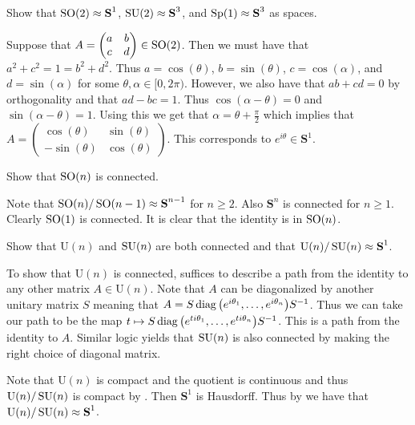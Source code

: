 \documentclass[letterpaper, 11pt, oneside]{book}
\begin{document}
\begin{exercise}
  Show that $\operatorname{SO}(2) \approx \textbf{S}^{1}$, $\operatorname{SU}(2) \approx \textbf{S}^{3}$, and $\operatorname{Sp}(1) \approx \textbf{S}^{3}$ as spaces.
\end{exercise}
\begin{pf}
  Suppose that $A = \begin{pmatrix} a & b \\ c & d \end{pmatrix} \in \operatorname{SO}(2)$.
  Then we must have that $a^{2} + c^{2} = 1 = b^{2} + d^{2}$.
  Thus $a = \cos(\theta)$, $b = \sin(\theta)$, $c = \cos(\alpha)$, and $d = \sin(\alpha)$ for some $\theta, \alpha \in [0, 2\pi)$.
  However, we also have that $ab + cd = 0$ by orthogonality and that $ad - bc = 1$.
  Thus $\cos(\alpha - \theta) = 0$ and $\sin(\alpha - \theta) = 1$.
  Using this we get that $\alpha = \theta + \frac{\pi}{2}$ which implies that $A = \begin{pmatrix} \cos(\theta) & \sin(\theta) \\ -\sin(\theta) & \cos(\theta) \end{pmatrix}$.
  This corresponds to $e^{i \theta} \in \textbf{S}^{1}$.

\end{pf}

\begin{exercise}
  Show that $\operatorname{SO}(n)$ is connected.
\end{exercise}
\begin{pf}
  Note that $\operatorname{SO}(n) / \operatorname{SO}(n - 1) \approx \textbf{S}^{n - 1}$ for $n \geq 2$.
  Also $\textbf{S}^{n}$ is connected for $n \geq 1$.
  Clearly $\operatorname{SO}(1)$ is connected.
  It is clear that the identity is in $\operatorname{SO}(n)$.
\end{pf}

\begin{exercise}
  Show that $\text{U}(n)$ and $\operatorname{SU}(n)$ are both connected and that $\text{U}(n)/\operatorname{SU}(n) \approx \textbf{S}^{1}$.
\end{exercise}
\begin{pf}
  To show that $\text{U}(n)$ is connected, suffices to describe a path from the identity to any other matrix $A \in \text{U}(n)$.
  Note that $A$ can be diagonalized by another unitary matrix $S$ meaning that $A = S \diag\pqty{e^{i \theta_{1}}, \ldots, e^{i \theta_{n}}} S^{-1}$.
  Thus we can take our path to be the map $t \mapsto S \diag\pqty{e^{ti \theta_{1}}, \ldots, e^{ti \theta_{n}}} S^{-1}$.
  This is a path from the identity to $A$.
  Similar logic yields that $\operatorname{SU}(n)$ is also connected by making the right choice of diagonal matrix.

  Note that $\text{U}(n)$ is compact and the quotient is continuous and thus $\text{U}(n) / \operatorname{SU}(n)$ is compact by .
  Then $\textbf{S}^{1}$ is Hausdorff.
  Thus by  we have that $\text{U}(n)/\operatorname{SU}(n) \approx \textbf{S}^{1}$.
\end{pf}
\end{document}
